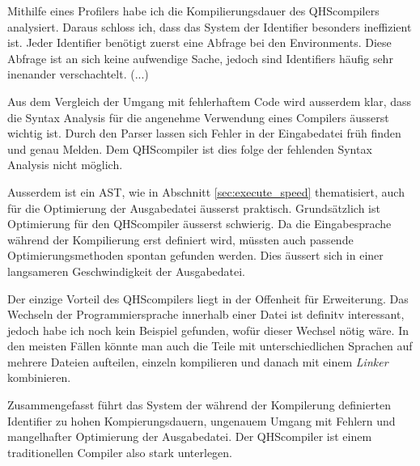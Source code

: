 Mithilfe eines Profilers habe ich die Kompilierungsdauer des QHScompilers analysiert. Daraus schloss ich, dass das System der Identifier besonders ineffizient ist. 
Jeder Identifier benötigt zuerst eine Abfrage bei den Environments. Diese Abfrage ist an sich keine aufwendige Sache, jedoch sind Identifiers häufig sehr inenander verschachtelt.
(...)

Aus dem Vergleich der Umgang mit fehlerhaftem Code wird ausserdem klar, dass die Syntax Analysis für die angenehme Verwendung eines Compilers äusserst wichtig ist.
Durch den Parser lassen sich Fehler in der Eingabedatei früh finden und genau Melden. Dem QHScompiler ist dies folge der fehlenden Syntax Analysis nicht möglich.

Ausserdem ist ein AST, wie in Abschnitt \ref{sec:execute_speed} thematisiert, auch für die Optimierung der Ausgabedatei äusserst praktisch.
Grundsätzlich ist Optimierung für den QHScompiler äusserst schwierig. Da die Eingabesprache während der Kompilierung erst definiert wird, müssten auch passende Optimierungsmethoden spontan gefunden werden.
Dies äussert sich in einer langsameren Geschwindigkeit der Ausgabedatei.

Der einzige Vorteil des QHScompilers liegt in der Offenheit für Erweiterung.
Das Wechseln der Programmiersprache innerhalb einer Datei ist definitv interessant, jedoch habe ich noch kein Beispiel gefunden, wofür dieser Wechsel nötig wäre.
In den meisten Fällen könnte man auch die Teile mit unterschiedlichen Sprachen auf mehrere Dateien aufteilen, einzeln kompilieren und danach mit einem \textit{Linker} kombinieren.

Zusammengefasst führt das System der während der Kompilerung definierten Identifier zu hohen Kompierungsdauern, ungenauem Umgang mit Fehlern und mangelhafter Optimierung der Ausgabedatei.
Der QHScompiler ist einem traditionellen Compiler also stark unterlegen.
